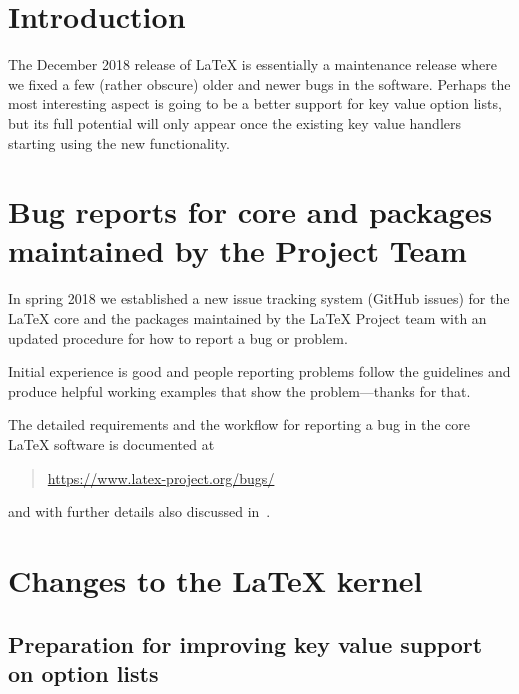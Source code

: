 \documentclass{ltnews}
\begin{document}
\maketitle
\tableofcontents

\setlength{}

\bigskip

\section{Introduction}

The December 2018 release of \LaTeX{} is essentially a maintenance
release where we fixed a few (rather obscure) older and newer bugs in
the software. Perhaps the most interesting aspect is going to be a
better support for key value option lists, but its full potential will
only appear once the existing key value handlers starting using the
new functionality.

\section[Bug reports for core \LaTeXe{} and packages]
        {Bug reports for core \LaTeXe{} and packages maintained by the Project Team}



In spring 2018 we established a new issue tracking system (GitHub
issues) for the \LaTeX{} core and the packages maintained by the
\LaTeX{} Project team with an updated procedure for how to report a bug or
problem.

Initial experience is good and people reporting problems follow the
guidelines and produce helpful working examples that show the
problem---thanks for that.

The detailed requirements and the workflow for reporting a bug in the
core \LaTeX{} software is documented at
\begin{quote}
\url{https://www.latex-project.org/bugs/}
\end{quote}
and with further details also discussed in~\cite{Mittelbach:TB39-1}.


\section{Changes to the \LaTeX{} kernel}

\subsection{Preparation for improving key value support on option lists}
\end{document}
